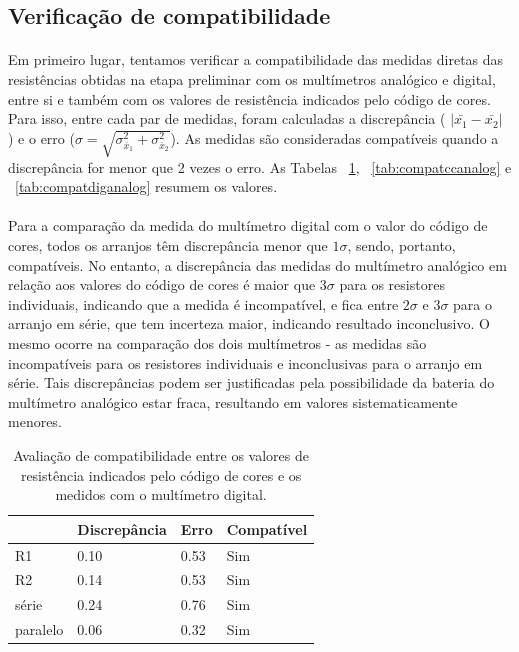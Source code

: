 \documentclass[11pt,a4paper]{article}
\begin{document}
    \clearpage
    \subsection{Verificação de compatibilidade}
    
      \paragraph{}
      Em primeiro lugar, tentamos verificar a compatibilidade das medidas diretas das resistências obtidas na etapa preliminar com os multímetros analógico e digital, entre si e também com os valores de resistência indicados pelo código de cores.  Para isso, entre cada par de medidas, foram calculadas a discrepância ( $|\bar{x_1}-\bar{x_2}|$ ) e o erro ($\sigma = \sqrt{\sigma_{\bar{x}_1}^2 + \sigma_{\bar{x}_2}^2}$). As medidas são consideradas compatíveis quando a discrepância for menor que 2 vezes o erro. As Tabelas ~\ref{tab:compatccdig}, ~\ref{tab:compatccanalog} e ~\ref{tab:compatdiganalog} resumem os valores.
      \paragraph{}
      Para a comparação da medida do multímetro digital com o valor do código de cores, todos os arranjos têm discrepância menor que $1\sigma$, sendo, portanto, compatíveis. No entanto, a discrepância das medidas do multímetro analógico em relação aos valores do código de cores é maior que $3\sigma$ para os resistores individuais, indicando que a medida é incompatível, e fica entre $2\sigma$ e $3\sigma$ para o arranjo em série, que tem incerteza maior, indicando resultado inconclusivo. O mesmo ocorre na comparação dos dois multímetros - as medidas são incompatíveis para os resistores individuais e inconclusivas para o arranjo em série. Tais discrepâncias podem ser justificadas pela possibilidade da bateria do multímetro analógico estar fraca, resultando em valores sistematicamente menores.

       \begin{table}[htb!]
        \centering
        \begin{tabular}{llll}
        \toprule
                   & Discrepância      & Erro & Compatível                          \\
          \midrule
          R1       & 0.10              & 0.53 & {\color[HTML]{009901} Sim}          \\
          R2       & 0.14              & 0.53 & {\color[HTML]{009901} Sim}          \\
          série    & 0.24              & 0.76 & {\color[HTML]{009901} Sim}          \\
          paralelo & 0.06              & 0.32 & {\color[HTML]{009901} Sim}          \\
          \bottomrule
          
          \end{tabular}
        \caption{Avaliação de compatibilidade entre os valores de resistência indicados pelo código de cores e os medidos com o multímetro digital.}
        \label{tab:compatccdig}
        \end{table}
        
\end{document}
